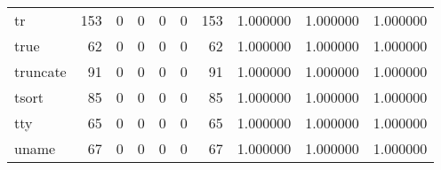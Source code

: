 \begin{tabular}{lrrrrrrrrr}
tr        &                                   153 &                                                  0 &                                                  0 &                                                  0 &                                                  0 &                                                153 &                                           1.000000 &                               1.000000 &                             1.000000 \\
true      &                                    62 &                                                  0 &                                                  0 &                                                  0 &                                                  0 &                                                 62 &                                           1.000000 &                               1.000000 &                             1.000000 \\
truncate  &                                    91 &                                                  0 &                                                  0 &                                                  0 &                                                  0 &                                                 91 &                                           1.000000 &                               1.000000 &                             1.000000 \\
tsort     &                                    85 &                                                  0 &                                                  0 &                                                  0 &                                                  0 &                                                 85 &                                           1.000000 &                               1.000000 &                             1.000000 \\
tty       &                                    65 &                                                  0 &                                                  0 &                                                  0 &                                                  0 &                                                 65 &                                           1.000000 &                               1.000000 &                             1.000000 \\
uname     &                                    67 &                                                  0 &                                                  0 &                                                  0 &                                                  0 &                                                 67 &                                           1.000000 &                               1.000000 &                             1.000000 \\

\end{tabular}
